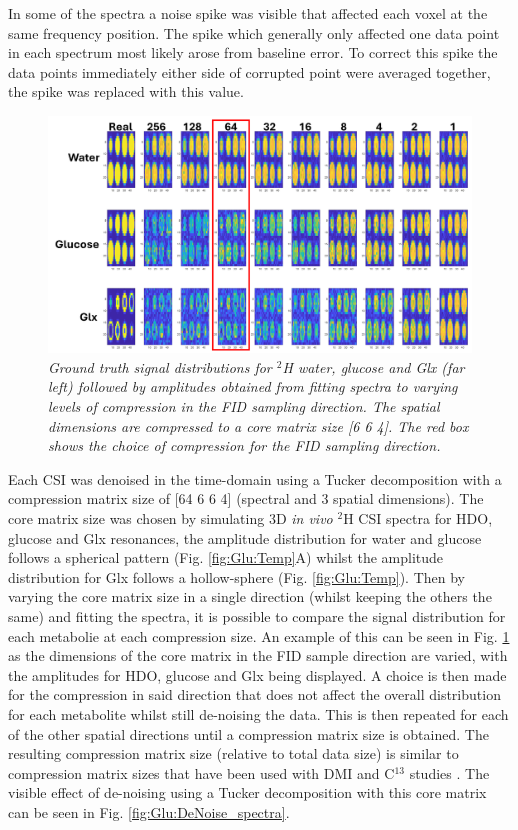 In some of the spectra a noise spike was visible that affected each voxel at the same frequency position. The spike which generally only affected one data point in each spectrum most likely arose from baseline error. To correct this spike the data points immediately either side of corrupted point were averaged together, the spike was replaced with this value. 


\begin{figure}
   \centering
   \includegraphics[width = 1\textwidth]{Figures/Glucose/DeNoise_Sim.png}
   \caption{\textit{Ground truth signal distributions for $^2$H water, glucose and Glx (far left) followed by amplitudes obtained from fitting spectra to varying levels of compression in the FID sampling direction. The spatial dimensions are compressed to a core matrix size [6 6 4]. The red box shows the choice of compression for the FID sampling direction.}}
   \label{fig:Glu:DeNoise}
\end{figure}

Each \ac{CSI} was denoised in the time-domain using a Tucker decomposition \cite{Bader2007EfficientTensors} with a compression matrix size of [64 6 6 4] (spectral and 3 spatial dimensions). The core matrix size was chosen by simulating 3D \textit{in vivo} $^2$H \ac{CSI} spectra for HDO, glucose and Glx resonances, the amplitude distribution for water and glucose follows a spherical pattern (Fig. \ref{fig:Glu:Temp}A) whilst the amplitude distribution for Glx follows a hollow-sphere (Fig. \ref{fig:Glu:Temp}). Then by varying the core matrix size in a single direction (whilst keeping the others the same) and fitting the spectra, it is possible to compare the signal distribution for each metabolie at each compression size. An example of this can be seen in Fig. \ref{fig:Glu:DeNoise} as the dimensions of the core matrix in the FID sample direction are varied, with the amplitudes for HDO, glucose and Glx being displayed. A choice is then made for the compression in said direction that does not affect the overall distribution for each metabolite whilst still de-noising the data. This is then repeated for each of the other spatial directions until a compression matrix size is obtained. The resulting compression matrix size (relative to total data size) is similar to compression matrix sizes that have been used with \ac{DMI} \cite{vonMorze2021ComparisonT, Kreis2020MeasuringMRI} and C$^{13}$ studies \cite{Brender2019DynamicHyperpolarization}. The visible effect of de-noising using a Tucker decomposition with this core matrix can be seen in Fig. \ref{fig:Glu:DeNoise_spectra}.

